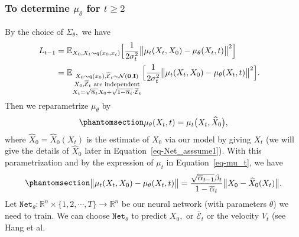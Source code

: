 \documentclass[
]{article}
\theoremstyle{remark}
\begin{document}
\begin{itemize}
  \subsubsection{\texorpdfstring{To determine \(\mu_{\theta}\) for
  \(t\geq 2\)}{To determine \textbackslash mu\_\{\textbackslash theta\} for t\textbackslash geq 2}}\label{to-determine-mu_theta-for-tgeq-2}

  By the choice of \(\Sigma_{\theta},\) we have \[
  \begin{aligned}
    L_{t-1} 
    &= \mathbb E_{X_0,X_t\sim q(x_0,x_t)} \Bigl[ \frac{1}{2\sigma_t^2} \bigl\lVert \mu_t(X_t,X_0) - \mu_{\theta}(X_t,t) \bigr\rVert^2 \Bigr] \cr 
    &= \mathbb E_{\substack{X_0\sim q(x_0), \overline{\mathcal{E}}_t\sim \mathcal{N}(\mathbf{0},\mathbf{I})\\ X_0,\overline{\mathcal{E}}_t \text{ are independent} \\X_t=\sqrt{\overline{\alpha}_t}X_0+\sqrt{1-\overline{\alpha}_t}\cdot \overline{\mathcal{E}}_t}} \Bigl[ \frac{1}{2\sigma_t^2} \bigl\lVert \mu_t(X_t,X_0) - \mu_{\theta}(X_t,t) \bigr\rVert^2 \Bigr].
  \end{aligned}
  \] Then we reparametrize \(\mu_{\theta}\) by
  \begin{equation}\phantomsection\label{eq-mu_the_mu_t}{
  \begin{aligned}
    \mu_{\theta}(X_t,t)=\mu_t\bigl(X_t, \widehat{X}_0\bigr),
  \end{aligned}
  }\end{equation} where \(\widehat{X}_0=\widehat{X}_0(X_t)\) is the
  estimate of \(X_0\) via our model by giving \(X_t\) (we will give the
  details of \(\widehat{X}_0\) later in Equation~\ref{eq-Net_asssume1}).
  With this parametrization and by the expression of \(\mu_{t}\) in
  Equation~\ref{eq-mu_t}, we have
  \begin{equation}\phantomsection\label{eq-Net_asssume0}{
  \begin{aligned}
    \bigl\lVert \mu_t(X_t,X_0) - \mu_{\theta}(X_t,t)  \bigr\rVert 
    = \frac{\sqrt{\overline{\alpha}_{t-1}}\beta_t}{1-\overline{\alpha}_t}\big\lVert X_0 - \widehat{X}_0(X_t) \big\rVert.
  \end{aligned}
  }\end{equation} Let
  \(\mathtt{Net}_{\theta}:\mathbb R^n\times \lbrace 1,2,\cdots,T\rbrace\longrightarrow \mathbb R^n\)
  be our neural network (with parameters \(\theta\)) we need to train.
  We can choose \(\mathtt{Net}_{\theta}\) to predict \(X_0,\) or
  \(\overline{\mathcal{E}}_t\) or the velocity \(V_t\) (see Hang et al.

\end{itemize}
\end{document}
